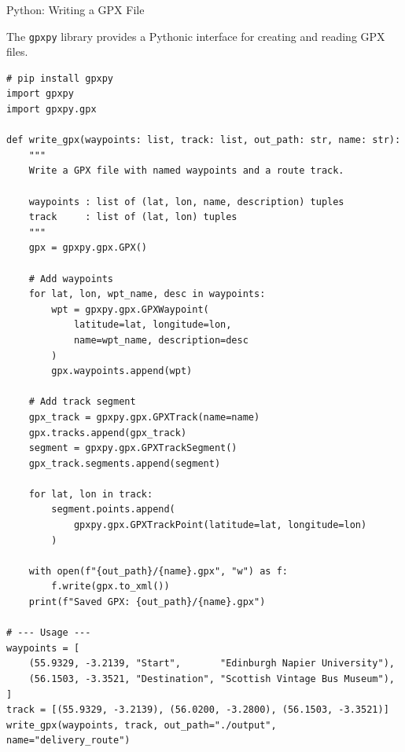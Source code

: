 \documentclass[aspectratio=169,10pt]{beamer}
\begin{document}
\begin{frame}[fragile]{Python: Writing a GPX File}

  The \texttt{gpxpy} library provides a Pythonic interface for creating
  and reading GPX files.

\begin{lstlisting}[style=pycode, caption={Writing a GPX file with gpxpy}]
# pip install gpxpy
import gpxpy
import gpxpy.gpx

def write_gpx(waypoints: list, track: list, out_path: str, name: str):
    """
    Write a GPX file with named waypoints and a route track.

    waypoints : list of (lat, lon, name, description) tuples
    track     : list of (lat, lon) tuples
    """
    gpx = gpxpy.gpx.GPX()

    # Add waypoints
    for lat, lon, wpt_name, desc in waypoints:
        wpt = gpxpy.gpx.GPXWaypoint(
            latitude=lat, longitude=lon,
            name=wpt_name, description=desc
        )
        gpx.waypoints.append(wpt)

    # Add track segment
    gpx_track = gpxpy.gpx.GPXTrack(name=name)
    gpx.tracks.append(gpx_track)
    segment = gpxpy.gpx.GPXTrackSegment()
    gpx_track.segments.append(segment)

    for lat, lon in track:
        segment.points.append(
            gpxpy.gpx.GPXTrackPoint(latitude=lat, longitude=lon)
        )

    with open(f"{out_path}/{name}.gpx", "w") as f:
        f.write(gpx.to_xml())
    print(f"Saved GPX: {out_path}/{name}.gpx")

# --- Usage ---
waypoints = [
    (55.9329, -3.2139, "Start",       "Edinburgh Napier University"),
    (56.1503, -3.3521, "Destination", "Scottish Vintage Bus Museum"),
]
track = [(55.9329, -3.2139), (56.0200, -3.2800), (56.1503, -3.3521)]
write_gpx(waypoints, track, out_path="./output", name="delivery_route")
\end{lstlisting}

\end{frame}
\end{document}

